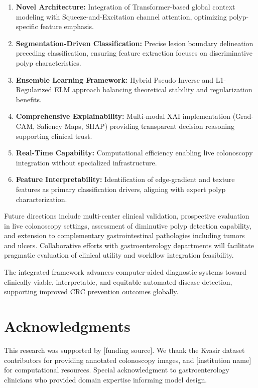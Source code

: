 \documentclass[11pt,a4paper]{article}
\begin{document}
\begin{enumerate}
\item \textbf{Novel Architecture:} Integration of Transformer-based global context modeling with Squeeze-and-Excitation channel attention, optimizing polyp-specific feature emphasis.

\item \textbf{Segmentation-Driven Classification:} Precise lesion boundary delineation preceding classification, ensuring feature extraction focuses on discriminative polyp characteristics.

\item \textbf{Ensemble Learning Framework:} Hybrid Pseudo-Inverse and L1-Regularized ELM approach balancing theoretical stability and regularization benefits.

\item \textbf{Comprehensive Explainability:} Multi-modal XAI implementation (Grad-CAM, Saliency Maps, SHAP) providing transparent decision reasoning supporting clinical trust.

\item \textbf{Real-Time Capability:} Computational efficiency enabling live colonoscopy integration without specialized infrastructure.

\item \textbf{Feature Interpretability:} Identification of edge-gradient and texture features as primary classification drivers, aligning with expert polyp characterization.
\end{enumerate}

Future directions include multi-center clinical validation, prospective evaluation in live colonoscopy settings, assessment of diminutive polyp detection capability, and extension to complementary gastrointestinal pathologies including tumors and ulcers. Collaborative efforts with gastroenterology departments will facilitate pragmatic evaluation of clinical utility and workflow integration feasibility.

The integrated framework advances computer-aided diagnostic systems toward clinically viable, interpretable, and equitable automated disease detection, supporting improved CRC prevention outcomes globally.

\section*{Acknowledgments}

This research was supported by [funding source]. We thank the Kvasir dataset contributors for providing annotated colonoscopy images, and [institution name] for computational resources. Special acknowledgment to gastroenterology clinicians who provided domain expertise informing model design.
\end{document}
